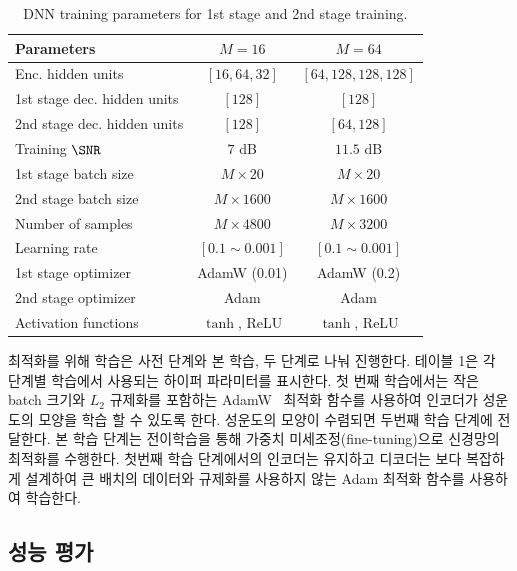 \documentclass[11pt]{oblivoir}
\begin{document}
\begin{table}[h!]
\footnotesize
\centering
\caption{DNN training parameters for 1st stage and 2nd stage training.}
\begin{tabular}{@{}lcc@{}}
\toprule
Parameters & $M=16$ & $M=64$ \\ \midrule
Enc. hidden units                 & $[16, 64,  32]$        & $[64, 128, 128, 128]$        \\
1st stage dec. hidden units           & $[128]$      & $[128]$        \\
2nd stage dec. hidden units           & $[128]$         & $[64, 128]$         \\
Training $\SNR$           & $7$ dB      & $11.5$ dB        \\
1st stage batch size           & $M\times 20$      & $M\times 20$        \\
2nd stage batch size           & $M\times 1600$         & $M\times 1600$         \\
Number of samples           & $M\times 4800$      & $M\times 3200$        \\
Learning rate              & $[0.1\sim 0.001]$       & $[0.1\sim 0.001]$        \\
1st stage optimizer              & AdamW (0.01)       & AdamW (0.2)        \\
2nd stage optimizer              & Adam       & Adam        \\
Activation functions  & $\tanh$, ReLU    & $\tanh$, ReLU        \\ 
\bottomrule
\end{tabular}
\label{tab:dnn}
\end{table}

최적화를 위해 학습은 사전 단계와 본 학습, 두 단계로 나눠 진행한다. 테이블 1은 각 단계별 학습에서 사용되는 하이퍼 파라미터를 표시한다. 첫 번째 학습에서는 작은 batch 크기와 $L_2$ 규제화를 포함하는 AdamW~\cite{loshchilov--hutter2018} 최적화 함수를 사용하여 인코더가 성운도의 모양을 학습 할 수 있도록 한다. 성운도의 모양이 수렴되면 두번째 학습 단계에 전달한다. 본 학습 단계는 전이학습을 통해 가중치 미세조정(fine-tuning)으로 신경망의 최적화를 수행한다. 첫번째 학습 단계에서의 인코더는 유지하고 디코더는 보다 복잡하게 설계하여 큰 배치의 데이터와 규제화를 사용하지 않는 Adam 최적화 함수를 사용하여 학습한다. 

\subsection{성능 평가}
\end{document}
